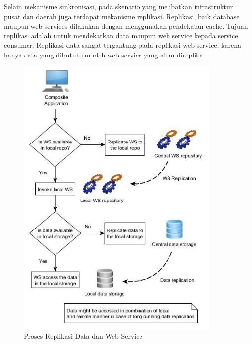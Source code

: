Selain mekanisme sinkronisasi, pada skenario yang melibatkan infrastruktur pusat dan daerah juga terdapat mekanisme replikasi. Replikasi, baik database maupun web services dilakukan dengan menggunakan pendekatan cache. Tujuan replikasi adalah untuk mendekatkan data maupun web service kepada service consumer. Replikasi data sangat tergantung pada replikasi web service, karena hanya data yang dibutuhkan oleh web service yang akan direplika.

\begin{figure}[h]
    \centering
    \includegraphics[width=10cm]{../../Resources/Images/takdir-replication}
    \caption{Proses Replikasi Data dan Web Service}
    \label{fig:replication}
\end{figure}


